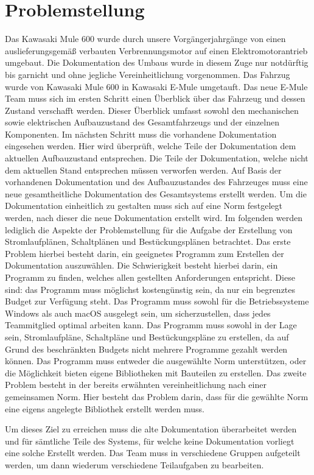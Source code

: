 \section{Problemstellung}
Das Kawasaki Mule 600 wurde durch unsere Vorgängerjahrgänge von einen auslieferungsgemäß verbauten Verbrennungsmotor auf einen Elektromotorantrieb umgebaut. Die Dokumentation des Umbaus wurde in diesem Zuge nur notdürftig bis garnicht und ohne jegliche Vereinheitlichung vorgenommen. Das Fahrzug wurde von Kawasaki Mule 600 in Kawasaki E-Mule umgetauft. Das neue E-Mule Team muss sich im ersten Schritt einen Überblick über das Fahrzeug und dessen Zustand verschafft werden. Dieser Überblick umfasst sowohl den mechanischen sowie elektrischen Aufbauzustand des Gesamtfahrzeugs und der einzelnen Komponenten. Im nächsten Schritt muss die vorhandene Dokumentation eingesehen werden. Hier wird überprüft, welche Teile der Dokumentation dem aktuellen Aufbauzustand entsprechen. Die Teile der Dokumentation, welche nicht dem aktuellen Stand entsprechen müssen verworfen werden. Auf Basis der vorhandenen Dokumentation und des Aufbauzustandes des Fahrzeuges muss eine neue gesamtheitliche Dokumentation des Gesamtsystems erstellt werden. Um die Dokumentation einheitlich zu gestalten muss sich auf eine Norm festgelegt werden, nach dieser die neue Dokumentation erstellt wird.  Im folgenden werden lediglich die Aspekte der Problemstellung für die Aufgabe der Erstellung von Stromlaufplänen, Schaltplänen und Bestückungsplänen betrachtet. Das erste Problem hierbei besteht darin, ein geeignetes Programm zum Erstellen der Dokumentation auszuwählen. Die Schwierigkeit besteht hierbei darin, ein Programm zu finden, welches allen gestellten Anforderungen entspricht. Diese sind: das Programm muss möglichst kostengünstig sein, da nur ein begrenztes Budget zur Verfügung steht. Das Programm muss sowohl für die Betriebssysteme Windows als auch macOS ausgelegt sein, um sicherzustellen, dass jedes Teammitglied optimal arbeiten kann. Das Programm muss sowohl in der Lage sein, Stromlaufpläne, Schaltpläne und Bestückungspläne zu erstellen, da auf Grund des beschränkten Budgets nicht mehrere Programme gezahlt werden können. Das Programm muss entweder die ausgewählte Norm unterstützen, oder die Möglichkeit bieten eigene Bibliotheken mit Bauteilen zu erstellen. Das zweite Problem besteht in der bereits erwähnten vereinheitlichung nach einer gemeinsamen Norm. Hier besteht das Problem darin, dass für die gewählte Norm eine eigens angelegte Bibliothek erstellt werden muss.

Um dieses Ziel zu erreichen muss die alte Dokumentation überarbeitet werden und für sämtliche Teile des Systems, für welche keine Dokumentation vorliegt eine solche Erstellt werden. Das Team muss in verschiedene Gruppen aufgeteilt werden, um dann wiederum verschiedene Teilaufgaben zu bearbeiten.

